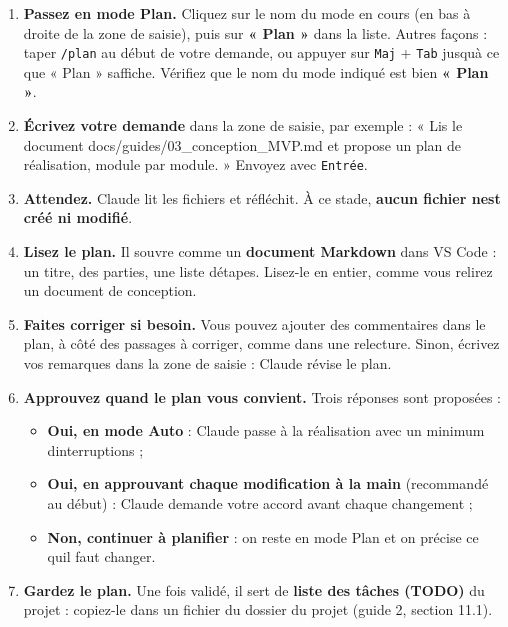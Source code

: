 \documentclass[
  french,
  11pt,
  a4paper,
]{article}
\providecommand{\tightlist}{%
  \setlength{\itemsep}{0pt}\setlength{\parskip}{0pt}}
\begin{document}
\begin{enumerate}
\def\labelenumi{\arabic{enumi}.}
\tightlist
\item
  \textbf{Passez en mode Plan.} Cliquez sur le nom du mode en cours (en
  bas à droite de la zone de saisie), puis sur \textbf{« Plan »} dans la
  liste. Autres façons : taper \texttt{/plan} au début de votre demande,
  ou appuyer sur \texttt{Maj} + \texttt{Tab} jusqu\textquotesingle à ce
  que « Plan » s\textquotesingle affiche. Vérifiez que le nom du mode
  indiqué est bien \textbf{« Plan »}.
\item
  \textbf{Écrivez votre demande} dans la zone de saisie, par exemple : «
  Lis le document docs/guides/03\_conception\_MVP.md et propose un plan
  de réalisation, module par module. » Envoyez avec \texttt{Entrée}.
\item
  \textbf{Attendez.} Claude lit les fichiers et réfléchit. À ce stade,
  \textbf{aucun fichier n\textquotesingle est créé ni modifié}.
\item
  \textbf{Lisez le plan.} Il s\textquotesingle ouvre comme un
  \textbf{document Markdown} dans VS Code : un titre, des parties, une
  liste d\textquotesingle étapes. Lisez-le en entier, comme vous relirez
  un document de conception.
\item
  \textbf{Faites corriger si besoin.} Vous pouvez ajouter des
  commentaires dans le plan, à côté des passages à corriger, comme dans
  une relecture. Sinon, écrivez vos remarques dans la zone de saisie :
  Claude révise le plan.
\item
  \textbf{Approuvez quand le plan vous convient.} Trois réponses sont
  proposées :

  \begin{itemize}
  \tightlist
  \item
    \textbf{Oui, en mode Auto} : Claude passe à la réalisation avec un
    minimum d\textquotesingle interruptions ;
  \item
    \textbf{Oui, en approuvant chaque modification à la main}
    (recommandé au début) : Claude demande votre accord avant chaque
    changement ;
  \item
    \textbf{Non, continuer à planifier} : on reste en mode Plan et on
    précise ce qu\textquotesingle il faut changer.
  \end{itemize}
\item
  \textbf{Gardez le plan.} Une fois validé, il sert de \textbf{liste des
  tâches (TODO)} du projet : copiez-le dans un fichier du dossier du
  projet (guide 2, section 11.1).
\end{enumerate}
\end{document}
